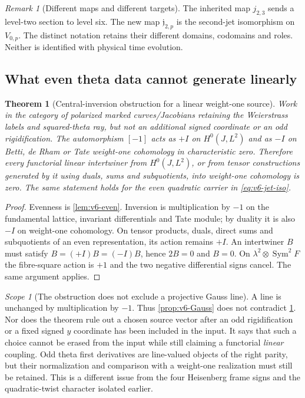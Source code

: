 \documentclass[11pt]{article}
\newtheorem{theorem}{Theorem}[section]
\theoremstyle{definition}
\theoremstyle{remark}
\newtheorem{remark}[remark]{Remark}
\newtheorem{scope}[scope]{Scope}
\begin{document}
\begin{remark}[Different maps and different targets]
The inherited map $j_{2,3}$ sends a level-two section to level six.
The new map $\mathfrak j_{2,p}$ is the second-jet isomorphism on
$V_{0,p}$. The distinct notation retains their different domains,
codomains and roles. Neither is identified with physical time evolution.
\end{remark}

\subsection{What even theta data cannot generate linearly}
\begin{theorem}[Central-inversion obstruction for a linear weight-one source]
\label{thm:v6-parity}
Work in the category of polarized marked curves/Jacobians retaining the
Weierstrass labels and squared-theta ray, but not an additional signed
coordinate or an odd rigidification. The automorphism $[-1]$ acts as
$+I$ on $H^0(J,L^2)$ and as $-I$ on Betti, de Rham or Tate weight-one
cohomology in characteristic zero. Therefore every functorial linear
intertwiner from $H^0(J,L^2)$, or from tensor constructions generated by
it using duals, sums and subquotients, into weight-one cohomology is zero.
The same statement holds for the even quadratic carrier in
\eqref{eq:v6-jet-iso}.
\end{theorem}
\begin{proof}
Evenness is \cref{lem:v6-even}. Inversion is multiplication by $-1$
on the fundamental lattice, invariant differentials and Tate module;
by duality it is also $-I$ on weight-one cohomology. On tensor products,
duals, direct sums and subquotients of an even representation, its action
remains $+I$. An intertwiner $B$ must satisfy
$B=(+I)B=(-I)B$, hence $2B=0$ and $B=0$.
On $\lambda^2\otimes\operatorname{Sym}^2F$ the fibre-square action is
$+1$ and the two negative differential signs cancel. The same argument
applies.
\end{proof}

\begin{scope}[The obstruction does not exclude a projective Gauss line]
A line is unchanged by multiplication by $-1$. Thus
\cref{prop:v6-Gauss} does not contradict \cref{thm:v6-parity}.
Nor does the theorem rule out a chosen source vector after an odd
rigidification or a fixed signed $y$ coordinate has been included in the
input. It says that such a choice cannot be erased from the input while
still claiming a functorial \emph{linear} coupling. Odd theta
first derivatives are line-valued objects of the right parity, but their
normalization and comparison with a weight-one realization must still
be retained. This is a different issue from the four Heisenberg frame
signs and the quadratic-twist character isolated earlier.
\end{scope}
\end{document}
